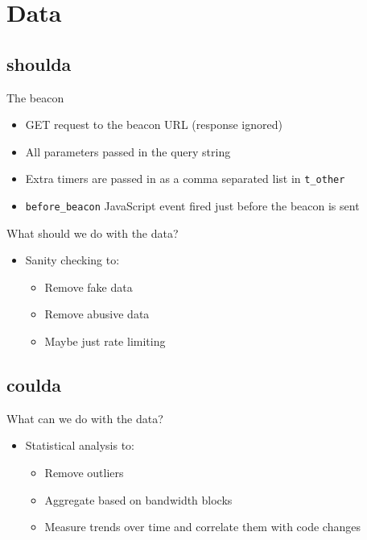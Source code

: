 \documentclass{beamer}
\begin{document}
\section{Data}
\label{sec:data}

\subsection{shoulda}

\begin{frame}{The beacon}
  \begin{itemize}
  \item GET request to the beacon URL (response ignored)
  \item All parameters passed in the query string
  \item Extra timers are passed in as a comma separated list in \texttt{t\_other}
  \item \texttt{before\_beacon} JavaScript event fired just before the beacon is sent
  \end{itemize}
\end{frame}

\begin{frame}{What should we do with the data?}
  \begin{itemize}
  \item Sanity checking to:
    \begin{itemize}
    \item Remove fake data
    \item Remove abusive data
    \item Maybe just rate limiting
    \end{itemize}
  \end{itemize}
\end{frame}

\subsection{coulda}
\begin{frame}{What can we do with the data?}
  \begin{itemize}
  \item Statistical analysis to:
    \begin{itemize}
    \item Remove outliers
    \item Aggregate based on bandwidth blocks
    \item Measure trends over time and correlate them with code changes
    \end{itemize}
  \end{itemize}
\end{frame}
\end{document}
